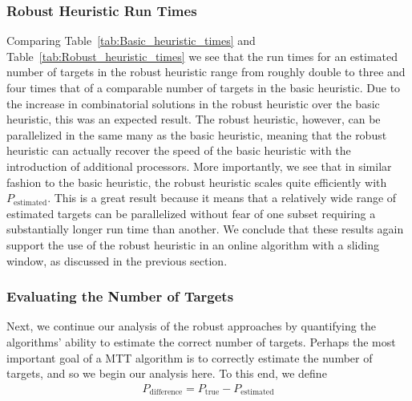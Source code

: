 \documentclass[journal]{IEEEtran}
\begin{document}
\subsubsection{Robust Heuristic Run Times} Comparing Table~\ref{tab:Basic_heuristic_times} and Table~\ref{tab:Robust_heuristic_times} we see that the run times for an estimated number of targets in the robust heuristic range from roughly double to three and four times that of a comparable number of targets in the basic heuristic. Due to the increase in combinatorial solutions in the robust heuristic over the basic heuristic, this was an expected result. The robust heuristic, however, can be parallelized in the same many as the basic heuristic, meaning that the robust heuristic can actually recover the speed of the basic heuristic with the introduction of additional processors. More importantly, we see that in similar fashion to the basic heuristic, the robust heuristic scales quite efficiently with $P_{\text{estimated}}$. This is a great result because it means that a relatively wide range of estimated targets can be parallelized without fear of one subset requiring a substantially longer run time than another. We conclude that these results again support the use of the robust heuristic in an online algorithm with a sliding window, as discussed in the previous section.

\subsubsection{Evaluating the Number of Targets}
Next, we continue our analysis of the robust approaches by quantifying the algorithms' ability to estimate the correct number of targets. Perhaps the most important goal of a MTT algorithm is to correctly estimate the number of targets, and so we begin our analysis here. To this end, we define
\begin{align}
	P_{\text{difference}} = P_{\text{true}} - P_{\text{estimated}}
\end{align}
\end{document}
